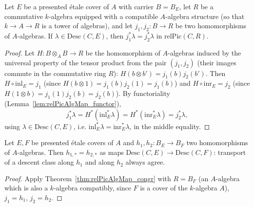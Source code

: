 \begin{theorem}
  \label{thm:relPicAlgMap_congr}
  \leanok
  Let \(E\) be a presented \'etale cover of \(A\) with carrier \(B = B_E\), let \(R\) be a
  commutative \(k\)-algebra equipped with a compatible \(A\)-algebra structure (so that
  \(k \to A \to R\) is a tower of algebras), and let \(j_1, j_2 \colon B \to R\) be two
  homomorphisms of \(A\)-algebras. If \(\lambda \in \mathrm{Desc}(C,E)\), then
  \(j_1^{*}\lambda = j_2^{*}\lambda\) in \(\mathrm{relPic}(C,R)\).
\end{theorem}
\begin{proof}
  \leanok
  Let \(H \colon B \otimes_A B \to R\) be the homomorphism of \(A\)-algebras induced by the
  universal property of the tensor product from the pair \((j_1, j_2)\) (their images commute
  in the commutative ring \(R\)): \(H(b \otimes b') = j_1(b) j_2(b')\). Then
  \(H \circ \mathrm{inl}_E = j_1\) (since \(H(b \otimes 1) = j_1(b) j_2(1) = j_1(b)\)) and
  \(H \circ \mathrm{inr}_E = j_2\) (since \(H(1 \otimes b) = j_1(1) j_2(b) = j_2(b)\)). By
  functoriality (Lemma~\ref{lem:relPicAlgMap_functor}),
  \[
    j_1^{*}\lambda = H^{*}(\mathrm{inl}_E^{*}\lambda) = H^{*}(\mathrm{inr}_E^{*}\lambda)
    = j_2^{*}\lambda,
  \]
  using \(\lambda \in \mathrm{Desc}(C,E)\), i.e. \(\mathrm{inl}_E^{*}\lambda =
  \mathrm{inr}_E^{*}\lambda\), in the middle equality.
\end{proof}

\begin{theorem}
  \label{thm:descentMap_congr}
  \leanok
  Let \(E, F\) be presented \'etale covers of \(A\) and \(h_1, h_2 \colon B_E \to B_F\) two
  homomorphisms of \(A\)-algebras. Then \(h_{1,*} = h_{2,*}\) as maps
  \(\mathrm{Desc}(C,E) \to \mathrm{Desc}(C,F)\): transport of a descent class along \(h_1\) and
  along \(h_2\) always agree.
\end{theorem}
\begin{proof}
  \leanok
  Apply Theorem~\ref{thm:relPicAlgMap_congr} with \(R = B_F\) (an \(A\)-algebra which is also a
  \(k\)-algebra compatibly, since \(F\) is a cover of the \(k\)-algebra \(A\)), \(j_1 = h_1\),
  \(j_2 = h_2\).
\end{proof}

